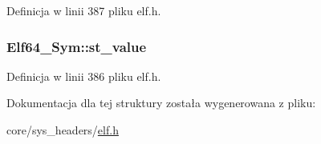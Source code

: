 Definicja w linii 387 pliku elf.\-h.

\hypertarget{struct_elf64___sym_a9601295da4c2e81cc18c1f777609e1bf}{
\subsubsection[{st\-\_\-value}]{ Elf64\-\_\-\-Sym\-::st\-\_\-value}}\label{struct_elf64___sym_a9601295da4c2e81cc18c1f777609e1bf}


Definicja w linii 386 pliku elf.\-h.



Dokumentacja dla tej struktury została wygenerowana z pliku\-:\begin{DoxyCompactItemize}
\item 
core/sys\-\_\-headers/\hyperlink{elf_8h}{elf.\-h}\end{DoxyCompactItemize}
